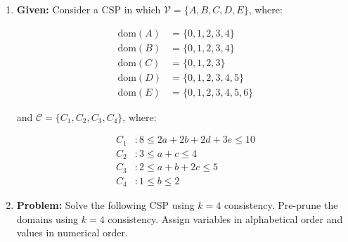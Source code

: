 \begin{example}
\end{example}
\newpage

\begin{example}
    \begin{enumerate}
        \item \textbf{Given:} Consider a CSP in which $\mathcal{V} = \{A, B, C, D, E\}$, where:

        \[
        \begin{aligned}
            \text{dom}(A) &= \{0, 1, 2, 3, 4\} \\
            \text{dom}(B) &= \{0, 1, 2, 3, 4\} \\
            \text{dom}(C) &= \{0, 1, 2, 3\} \\
            \text{dom}(D) &= \{0, 1, 2, 3, 4, 5\} \\
            \text{dom}(E) &= \{0, 1, 2, 3, 4, 5, 6\} 
        \end{aligned}
        \]
        
        and $\mathcal{C} = \{C_1, C_2, C_3, C_4\}$, where:
        
        \[
        \begin{aligned}
            C_1 &: 8 \leq 2a + 2b + 2d + 3e \leq 10 \\
            C_2 &: 3 \leq a + c \leq 4 \\
            C_3 &: 2 \leq a + b + 2c \leq 5 \\
            C_4 &: 1 \leq b \leq 2
        \end{aligned}
        \]
        
        \item \textbf{Problem:} Solve the following CSP using $k = 4$ consistency. Pre-prune the domains using $k = 4$ consistency. Assign variables in alphabetical order and values in numerical order.
    \end{enumerate}
\end{example}
\newpage

